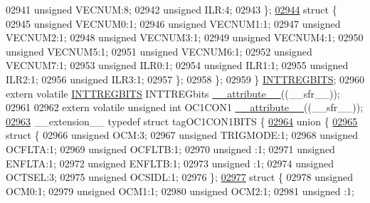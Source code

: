 \begin{DoxyCode}
02941       \textcolor{keywordtype}{unsigned} VECNUM:8;
02942       \textcolor{keywordtype}{unsigned} ILR:4;
02943     \};
\hypertarget{a00009_source_l02944}{}\hyperlink{a00009}{02944}     \textcolor{keyword}{struct }\{
02945       \textcolor{keywordtype}{unsigned} VECNUM0:1;
02946       \textcolor{keywordtype}{unsigned} VECNUM1:1;
02947       \textcolor{keywordtype}{unsigned} VECNUM2:1;
02948       \textcolor{keywordtype}{unsigned} VECNUM3:1;
02949       \textcolor{keywordtype}{unsigned} VECNUM4:1;
02950       \textcolor{keywordtype}{unsigned} VECNUM5:1;
02951       \textcolor{keywordtype}{unsigned} VECNUM6:1;
02952       \textcolor{keywordtype}{unsigned} VECNUM7:1;
02953       \textcolor{keywordtype}{unsigned} ILR0:1;
02954       \textcolor{keywordtype}{unsigned} ILR1:1;
02955       \textcolor{keywordtype}{unsigned} ILR2:1;
02956       \textcolor{keywordtype}{unsigned} ILR3:1;
02957     \};
02958   \};
02959 \} \hyperlink{a00008_d8/db6/a00501}{INTTREGBITS};
02960 \textcolor{keyword}{extern} \textcolor{keyword}{volatile} \hyperlink{a00008_d8/db6/a00501}{INTTREGBITS} INTTREGbits \hyperlink{a00009_a493c46f03454991ccc5aa7a6e1dfb2a7}{\_\_attribute\_\_}((\_\_sfr\_\_));
02961 
02962 \textcolor{keyword}{extern} \textcolor{keyword}{volatile} \textcolor{keywordtype}{unsigned} \textcolor{keywordtype}{int}  OC1CON1 \hyperlink{a00009_a493c46f03454991ccc5aa7a6e1dfb2a7}{\_\_attribute\_\_}((\_\_sfr\_\_));
\hypertarget{a00009_source_l02963}{}\hyperlink{a00008}{02963} \_\_extension\_\_ \textcolor{keyword}{typedef} \textcolor{keyword}{struct }tagOC1CON1BITS \{
\hypertarget{a00009_source_l02964}{}\hyperlink{a00009}{02964}   \textcolor{keyword}{union }\{
\hypertarget{a00009_source_l02965}{}\hyperlink{a00009}{02965}     \textcolor{keyword}{struct }\{
02966       \textcolor{keywordtype}{unsigned} OCM:3;
02967       \textcolor{keywordtype}{unsigned} TRIGMODE:1;
02968       \textcolor{keywordtype}{unsigned} OCFLTA:1;
02969       \textcolor{keywordtype}{unsigned} OCFLTB:1;
02970       \textcolor{keywordtype}{unsigned} :1;
02971       \textcolor{keywordtype}{unsigned} ENFLTA:1;
02972       \textcolor{keywordtype}{unsigned} ENFLTB:1;
02973       \textcolor{keywordtype}{unsigned} :1;
02974       \textcolor{keywordtype}{unsigned} OCTSEL:3;
02975       \textcolor{keywordtype}{unsigned} OCSIDL:1;
02976     \};
\hypertarget{a00009_source_l02977}{}\hyperlink{a00009}{02977}     \textcolor{keyword}{struct }\{
02978       \textcolor{keywordtype}{unsigned} OCM0:1;
02979       \textcolor{keywordtype}{unsigned} OCM1:1;
02980       \textcolor{keywordtype}{unsigned} OCM2:1;
02981       \textcolor{keywordtype}{unsigned} :1;

\end{DoxyCode}

